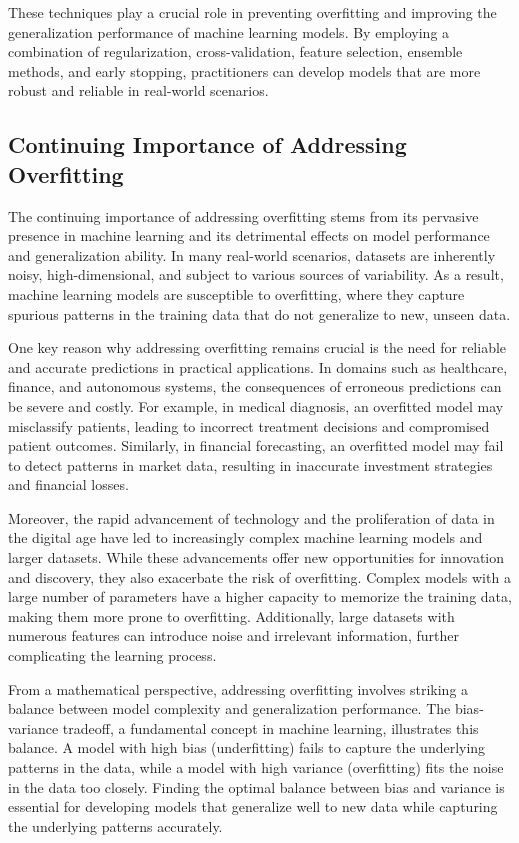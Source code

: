 \documentclass[12pt]{book} %
\begin{document}
These techniques play a crucial role in preventing overfitting and improving the generalization performance of machine learning models. By employing a combination of regularization, cross-validation, feature selection, ensemble methods, and early stopping, practitioners can develop models that are more robust and reliable in real-world scenarios.

\subsection{Continuing Importance of Addressing Overfitting}

The continuing importance of addressing overfitting stems from its pervasive presence in machine learning and its detrimental effects on model performance and generalization ability. In many real-world scenarios, datasets are inherently noisy, high-dimensional, and subject to various sources of variability. As a result, machine learning models are susceptible to overfitting, where they capture spurious patterns in the training data that do not generalize to new, unseen data.

One key reason why addressing overfitting remains crucial is the need for reliable and accurate predictions in practical applications. In domains such as healthcare, finance, and autonomous systems, the consequences of erroneous predictions can be severe and costly. For example, in medical diagnosis, an overfitted model may misclassify patients, leading to incorrect treatment decisions and compromised patient outcomes. Similarly, in financial forecasting, an overfitted model may fail to detect patterns in market data, resulting in inaccurate investment strategies and financial losses.

Moreover, the rapid advancement of technology and the proliferation of data in the digital age have led to increasingly complex machine learning models and larger datasets. While these advancements offer new opportunities for innovation and discovery, they also exacerbate the risk of overfitting. Complex models with a large number of parameters have a higher capacity to memorize the training data, making them more prone to overfitting. Additionally, large datasets with numerous features can introduce noise and irrelevant information, further complicating the learning process.

From a mathematical perspective, addressing overfitting involves striking a balance between model complexity and generalization performance. The bias-variance tradeoff, a fundamental concept in machine learning, illustrates this balance. A model with high bias (underfitting) fails to capture the underlying patterns in the data, while a model with high variance (overfitting) fits the noise in the data too closely. Finding the optimal balance between bias and variance is essential for developing models that generalize well to new data while capturing the underlying patterns accurately.
\end{document}
